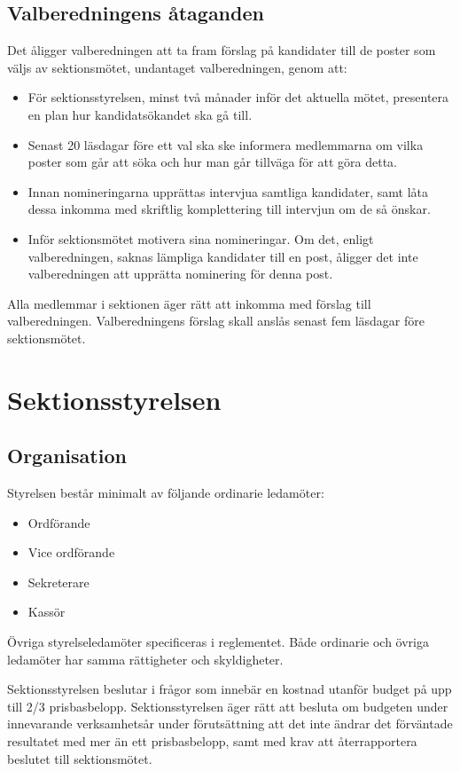 \documentclass{datateknologsektionen-document}
\begin{document}
\subsection{Valberedningens åtaganden}
Det åligger valberedningen att ta fram förslag på kandidater till de poster som väljs
av sektionsmötet, undantaget valberedningen, genom att:

\begin{itemize}
  \item För sektionsstyrelsen, minst två månader inför det aktuella mötet, presentera
        en plan hur kandidatsökandet ska gå till.
  \item Senast 20 läsdagar före ett val ska ske informera medlemmarna om vilka poster
        som går att söka och hur man går tillväga för att göra detta.
  \item Innan nomineringarna upprättas intervjua samtliga kandidater, samt låta dessa
        inkomma med skriftlig komplettering till intervjun om de så önskar.
  \item Inför sektionsmötet motivera sina nomineringar. Om det, enligt valberedningen,
        saknas lämpliga kandidater till en post, åligger det inte valberedningen att
        upprätta nominering för denna post.
\end{itemize}

Alla medlemmar i sektionen äger rätt att inkomma med förslag till valberedningen.
Valberedningens förslag skall anslås senast fem läsdagar före sektionsmötet.

\section{Sektionsstyrelsen}
\subsection{Organisation}
Styrelsen består minimalt av följande ordinarie ledamöter:
\begin{itemize}
  \item Ordförande
  \item Vice ordförande
  \item Sekreterare
  \item Kassör
\end{itemize}

Övriga styrelseledamöter specificeras i reglementet. Både ordinarie och övriga ledamöter
har samma rättigheter och skyldigheter.

Sektionsstyrelsen beslutar i frågor som innebär en kostnad utanför budget på upp till 2/3 prisbasbelopp.
Sektionsstyrelsen äger rätt att besluta om budgeten under innevarande verksamhetsår under förutsättning
att det inte ändrar det förväntade resultatet med mer än ett prisbasbelopp, samt med krav att
återrapportera beslutet till sektionsmötet.
\end{document}
